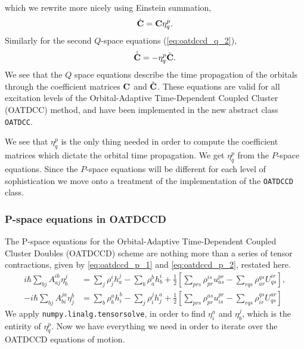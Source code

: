     which we rewrite more nicely using Einstein summation,
    \begin{equation}
        \dot{\vb{C}} = \vb{C}\eta^p_q.
    \end{equation}
    Similarly for the second $Q$-space equations (\autoref{eq:oatdccd_q_2}),
    \begin{equation}
       \dot{\tilde{\vb{C}}} = -\eta^p_q\tilde{\vb{C}}.
    \end{equation}
    We see that the $Q$ space equations
    describe the time propagation of the orbitals through the coefficient 
    matrices $\vb{C}$ and $\tilde{\vb{C}}$. These equations are valid 
    for all excitation levels of the Orbital-Adaptive Time-Dependent Coupled Cluster
    (OATDCC) method, and have been implemented 
    in the new abstract class \lstinline{OATDCC}.

    We see that $\eta^p_q$ is the only thing needed in order to compute the 
    coefficient matrices which dictate the orbital time propagation. We get $\eta^p_q$
    from the $P$-space equations. Since the $P$-space equations will be different for 
    each level of sophistication we move onto a treatment of 
    the implementation of the \lstinline{OATDCCD} class.

    \subsubsection{P-space equations in OATDCCD} 

    The P-space equations for the Orbital-Adaptive Time-Dependent Coupled Cluster 
    Doubles (OATDCCD) scheme are nothing more than a series of tensor contractions,
    given by \autoref{eq:oatdccd_p_1} and \autoref{eq:oatdccd_p_2}, restated here.
    \begin{align*}
    i\hbar\sum_{bj}A^{ib}_{aj} \eta^j_b
        &= \sum_j \rho^i_j h^j_a - \sum_b \rho^b_a h^i_b
        + \frac{1}{2}\left[
             \sum_{prs}\rho^{is}_{pr} u^{pr}_{as}
            -\sum_{rqs}\rho^{qs}_{ar} U^{ir}_{qs}
        \right], \\
    -i\hbar\sum_{bj}A^{ja}_{bi} \eta^b_j
        &= \sum_b \rho^a_b h^b_i - \sum_j \rho^j_i h^a_j
        + \frac{1}{2}\left[
             \sum_{prs}\rho^{as}_{pr} u^{pr}_{is}
            -\sum_{rqs}\rho^{qs}_{ir} U^{ar}_{qs}       
        \right]
    \end{align*}
    We apply \lstinline{numpy.linalg.tensorsolve}, in order to find $\eta^a_i$ and 
    $\eta^j_b$, which is the entirity of $\eta^p_q$.
    Now we have everything we need in order to iterate over the OATDCCD equations of 
    motion.

